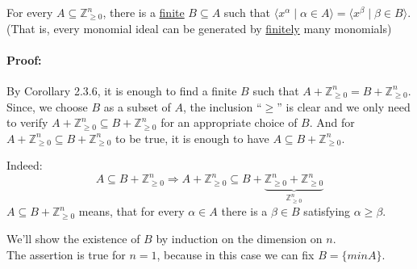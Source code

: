 \begin{theorem}[title = Dickson's Lemma]
  For every $A \subseteq \mathbb{Z}^n_{\geq 0}$, there is a \underline{finite} $B \subseteq A$ such that $\langle x^{\alpha} \mid \alpha \in A \rangle = \langle x^{\beta} \mid \beta \in B \rangle$. \\[0.3em]
  (That is, every monomial ideal can be generated by \underline{finitely} many monomials)

  \paragraph{Proof:} By Corollary 2.3.6, it is enough to find a finite $B$ such that $A + \mathbb{Z}^n_{\geq 0} = B + \mathbb{Z}^n_{\geq 0}$. Since, we choose $B$ as a subset of $A$, the inclusion \enquote{$\geq$}
  is clear and we only need to verify $A + \mathbb{Z}^n_{\geq 0} \subseteq B + \mathbb{Z}^n_{\geq 0}$ for an appropriate choice of $B$. And for $A + \mathbb{Z}^n_{\geq 0} \subseteq B + \mathbb{Z}^n_{\geq 0}$  
  to be true, it is enough to have $A \subseteq B + \mathbb{Z}^n_{\geq 0}$.  \\[0.3em]

  \begin{minipage}{0.59\textwidth}
    Indeed: \[A \subseteq B + \mathbb{Z}^n_{\geq 0} \Rightarrow A + \mathbb{Z}^n_{\geq 0} \subseteq B + \underbrace{\mathbb{Z}^n_{\geq 0} + \mathbb{Z}^n_{\geq 0}}_{\mathbb{Z}^n_{\geq 0}}\]
    $A \subseteq B + \mathbb{Z}^n_{\geq 0}$ means, that for every $\alpha \in A$ there is a $\beta \in B$ satisfying $\alpha \geq \beta$. 
  \end{minipage}
  \hspace*{0.6cm}
  \begin{minipage}{0.39\textwidth}
  \end{minipage}
 
  We'll show the existence of $B$ by induction on the dimension on $n$. \\[0.5em]
  The assertion is true for $n =1$, because in this case we can fix $B = \{min A\}$. \\[0.3em] 
  \begin{center}
\end{center}


\end{theorem}
